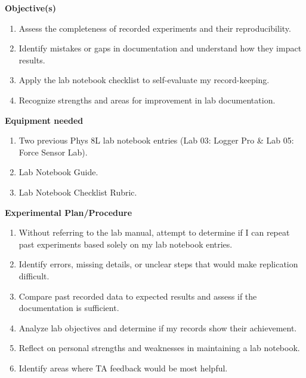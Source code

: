 \documentclass[idxtotoc,hyperref,openany]{labbook} %
\begin{document}
\hfill \break
\textbf{Objective(s)}
\begin{enumerate}[$\bullet$]
    \item Assess the completeness of recorded experiments and their reproducibility.
    \item Identify mistakes or gaps in documentation and understand how they impact results.
    \item Apply the lab notebook checklist to self-evaluate my record-keeping.
    \item Recognize strengths and areas for improvement in lab documentation.
\end{enumerate}

\hfill \break
\textbf{Equipment needed}
\begin{enumerate}[$\bullet$]
    \item Two previous Phys 8L lab notebook entries (Lab 03: Logger Pro \& Lab 05: Force Sensor Lab).
    \item Lab Notebook Guide.
    \item Lab Notebook Checklist Rubric.
\end{enumerate}

\hfill \break
\textbf{Experimental Plan/Procedure}
\begin{enumerate}
    \item Without referring to the lab manual, attempt to determine if I can repeat past experiments based solely on my lab notebook entries.
    \item Identify errors, missing details, or unclear steps that would make replication difficult.
    \item Compare past recorded data to expected results and assess if the documentation is sufficient.
    \item Analyze lab objectives and determine if my records show their achievement.
    \item Reflect on personal strengths and weaknesses in maintaining a lab notebook.
    \item Identify areas where TA feedback would be most helpful.
\end{enumerate}

\end{document}
